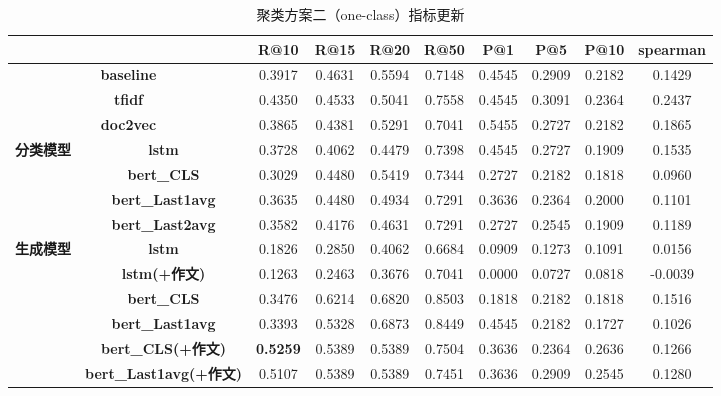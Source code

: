 \documentclass[11pt]{article}
\begin{document}
\begin{CJK}{UTF8}{gkai}
\begin{table}[htbp]\small
  \centering
  \begin{tabular}{c|c|c|c|c|c|c|c|c|c}
    \hline
    \multicolumn{2}{c|}{} & \textbf{R@10} & \textbf{R@15} & \textbf{R@20} & \textbf{R@50} & \textbf{P@1} & \textbf{P@5} & \textbf{P@10} & \textbf{spearman} \\
    \hline
    \multicolumn{2}{c|}{\textbf{baseline}} & 0.3917  & 0.4631  & 0.5594  & 0.7148  & 0.4545  & 0.2909  & 0.2182  & 0.1429  \\
    \hline
    \multicolumn{2}{c|}{\textbf{tfidf}} & 0.4350  & 0.4533  & 0.5041  & 0.7558  & 0.4545  & 0.3091  & 0.2364  & 0.2437  \\
    \hline
    \multicolumn{2}{c|}{\textbf{doc2vec}} & 0.3865  & 0.4381  & 0.5291  & 0.7041  & 0.5455  & 0.2727  & 0.2182  & 0.1865  \\
    \hline
    \multirow{4}[0]{*}{\textbf{分类模型}} & \textbf{lstm} & 0.3728  & 0.4062  & 0.4479  & 0.7398  & 0.4545  & 0.2727  & 0.1909  & 0.1535  \\
    & \textbf{bert\_CLS} & 0.3029  & 0.4480  & 0.5419  & 0.7344  & 0.2727  & 0.2182  & 0.1818  & 0.0960  \\
    & \textbf{bert\_Last1avg} & 0.3635  & 0.4480  & 0.4934  & 0.7291  & 0.3636  & 0.2364  & 0.2000  & 0.1101  \\
    & \textbf{bert\_Last2avg} & 0.3582  & 0.4176  & 0.4631  & 0.7291  & 0.2727  & 0.2545  & 0.1909  & 0.1189  \\
    \hline
    \multirow{6}[0]{*}{\textbf{生成模型}} & \textbf{lstm} & 0.1826  & 0.2850  & 0.4062  & 0.6684  & 0.0909  & 0.1273  & 0.1091  & 0.0156  \\
    & \textbf{lstm(+作文)} & 0.1263  & 0.2463  & 0.3676  & 0.7041  & 0.0000  & 0.0727  & 0.0818  & -0.0039  \\
    & \textbf{bert\_CLS} & 0.3476  & 0.6214  & 0.6820  & 0.8503  & 0.1818  & 0.2182  & 0.1818  & 0.1516  \\
    & \textbf{bert\_Last1avg} & 0.3393  & 0.5328  & 0.6873  & 0.8449  & 0.4545  & 0.2182  & 0.1727  & 0.1026  \\
    & \textbf{bert\_CLS(+作文)} & \textcolor[rgb]{ 1,  0,  0}{\textbf{0.5259 }} & 0.5389  & 0.5389  & 0.7504  & 0.3636  & 0.2364  & 0.2636  & 0.1266  \\
    & \textbf{bert\_Last1avg(+作文)} & 0.5107  & 0.5389  & 0.5389  & 0.7451  & 0.3636  & 0.2909  & 0.2545  & 0.1280  \\
    \hline
    \end{tabular}%
    \caption{聚类方案二（one-class）指标更新}
  \label{tab:addlabel}%
\end{table}%



\end{CJK}
\end{document}
